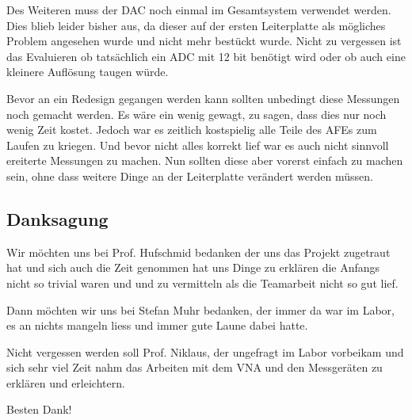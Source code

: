 Des Weiteren muss der DAC noch einmal im Gesamtsystem verwendet werden. Dies blieb leider bisher aus, da dieser auf der ersten Leiterplatte als mögliches Problem angesehen wurde und nicht mehr bestückt wurde.
Nicht zu vergessen ist das Evaluieren ob tatsächlich ein ADC mit 12 bit benötigt wird oder ob auch eine kleinere Auflösung taugen würde.

Bevor an ein Redesign gegangen werden kann sollten unbedingt diese Messungen noch gemacht werden. Es wäre ein wenig gewagt, zu sagen, dass dies nur noch wenig Zeit kostet. Jedoch war es zeitlich kostspielig alle Teile des AFEs zum Laufen zu kriegen. Und bevor nicht alles korrekt lief war es auch nicht sinnvoll ereiterte Messungen zu machen. Nun sollten diese aber vorerst einfach zu machen sein, ohne dass weitere Dinge an der Leiterplatte verändert werden müssen.

\subsection*{Danksagung}

Wir möchten uns bei Prof. Hufschmid bedanken der uns das Projekt zugetraut hat und sich auch die Zeit genommen hat uns Dinge zu erklären die Anfangs nicht so trivial waren und und zu vermitteln als die Teamarbeit nicht so gut lief.

Dann möchten wir uns bei Stefan Muhr bedanken, der immer da war im Labor, es an nichts mangeln liess und immer gute Laune dabei hatte.

Nicht vergessen werden soll Prof. Niklaus, der ungefragt im Labor vorbeikam und sich sehr viel Zeit nahm das Arbeiten mit dem VNA und den Messgeräten zu erklären und erleichtern.

Besten Dank!
